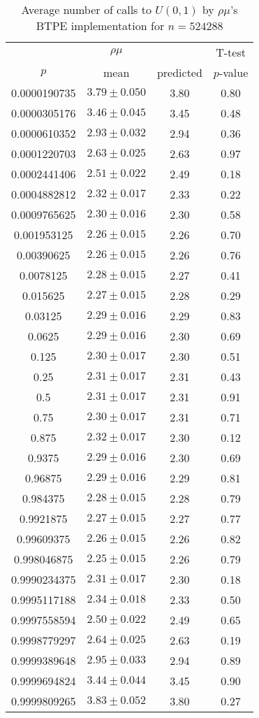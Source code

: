 \begin{table}[t]
\caption{Average number of calls to $U(0,1)$ by $\rho\mu$'s BTPE implementation for $n=524288$}
\label{tab:calls524288}
\begin{tabular}{cccc} \hline
    & $\rho\mu$ & & T-test \\
$p$ & mean & predicted & $p$-value \\ \hline
0.0000190735 & $3.79 \pm 0.050$ & 3.80 & 0.80 \\
0.0000305176 & $3.46 \pm 0.045$ & 3.45 & 0.48 \\
0.0000610352 & $2.93 \pm 0.032$ & 2.94 & 0.36 \\
0.0001220703 & $2.63 \pm 0.025$ & 2.63 & 0.97 \\
0.0002441406 & $2.51 \pm 0.022$ & 2.49 & 0.18 \\
0.0004882812 & $2.32 \pm 0.017$ & 2.33 & 0.22 \\
0.0009765625 & $2.30 \pm 0.016$ & 2.30 & 0.58 \\
0.001953125  & $2.26 \pm 0.015$ & 2.26 & 0.70 \\
0.00390625   & $2.26 \pm 0.015$ & 2.26 & 0.76 \\
0.0078125    & $2.28 \pm 0.015$ & 2.27 & 0.41 \\
0.015625     & $2.27 \pm 0.015$ & 2.28 & 0.29 \\
0.03125      & $2.29 \pm 0.016$ & 2.29 & 0.83 \\
0.0625       & $2.29 \pm 0.016$ & 2.30 & 0.69 \\
0.125        & $2.30 \pm 0.017$ & 2.30 & 0.51 \\
0.25         & $2.31 \pm 0.017$ & 2.31 & 0.43 \\
0.5          & $2.31 \pm 0.017$ & 2.31 & 0.91 \\
0.75         & $2.30 \pm 0.017$ & 2.31 & 0.71 \\
0.875        & $2.32 \pm 0.017$ & 2.30 & 0.12 \\
0.9375       & $2.29 \pm 0.016$ & 2.30 & 0.69 \\
0.96875      & $2.29 \pm 0.016$ & 2.29 & 0.81 \\
0.984375     & $2.28 \pm 0.015$ & 2.28 & 0.79 \\
0.9921875    & $2.27 \pm 0.015$ & 2.27 & 0.77 \\
0.99609375   & $2.26 \pm 0.015$ & 2.26 & 0.82 \\
0.998046875  & $2.25 \pm 0.015$ & 2.26 & 0.79 \\
0.9990234375 & $2.31 \pm 0.017$ & 2.30 & 0.18 \\
0.9995117188 & $2.34 \pm 0.018$ & 2.33 & 0.50 \\
0.9997558594 & $2.50 \pm 0.022$ & 2.49 & 0.65 \\
0.9998779297 & $2.64 \pm 0.025$ & 2.63 & 0.19 \\
0.9999389648 & $2.95 \pm 0.033$ & 2.94 & 0.89 \\
0.9999694824 & $3.44 \pm 0.044$ & 3.45 & 0.90 \\
0.9999809265 & $3.83 \pm 0.052$ & 3.80 & 0.27 \\
\hline
\end{tabular}
\end{table}

